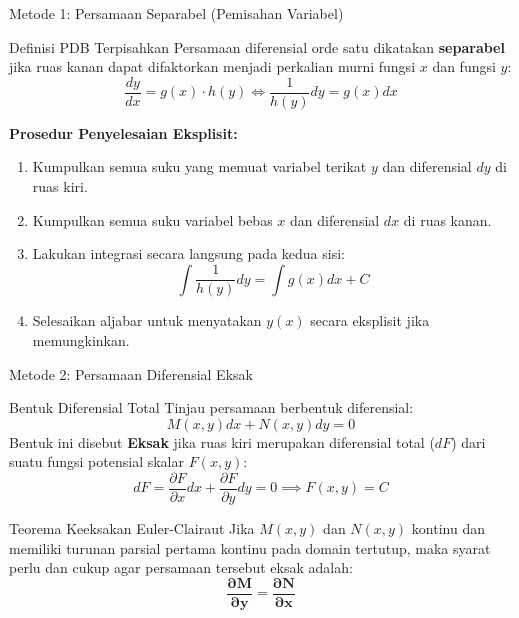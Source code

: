 \documentclass[aspectratio=169,10pt]{beamer}
\begin{document}
\begin{frame}{Metode 1: Persamaan Separabel (Pemisahan Variabel)}
  \begin{block}{Definisi PDB Terpisahkan}
    Persamaan diferensial orde satu dikatakan \textbf{separabel} jika ruas kanan dapat difaktorkan menjadi perkalian murni fungsi $x$ dan fungsi $y$:
    \begin{equation*}
      \frac{dy}{dx} = g(x) \cdot h(y) \iff \frac{1}{h(y)} dy = g(x) dx
    \end{equation*}
  \end{block}
  \vspace{0.15cm}
  \textbf{Prosedur Penyelesaian Eksplisit:}
  \begin{enumerate}
    \item Kumpulkan semua suku yang memuat variabel terikat $y$ dan diferensial $dy$ di ruas kiri.
    \item Kumpulkan semua suku variabel bebas $x$ dan diferensial $dx$ di ruas kanan.
    \item Lakukan integrasi secara langsung pada kedua sisi:
    \begin{equation*}
      \int \frac{1}{h(y)} dy = \int g(x) dx + C
    \end{equation*}
    \item Selesaikan aljabar untuk menyatakan $y(x)$ secara eksplisit jika memungkinkan.
  \end{enumerate}
\end{frame}

\begin{frame}{Metode 2: Persamaan Diferensial Eksak}
  \begin{block}{Bentuk Diferensial Total}
    Tinjau persamaan berbentuk diferensial:
    \begin{equation*}
      M(x,y) dx + N(x,y) dy = 0
    \end{equation*}
    Bentuk ini disebut \textbf{Eksak} jika ruas kiri merupakan diferensial total ($dF$) dari suatu fungsi potensial skalar $F(x,y)$:
    \begin{equation*}
      dF = \frac{\partial F}{\partial x} dx + \frac{\partial F}{\partial y} dy = 0 \implies F(x,y) = C
    \end{equation*}
  \end{block}
  \vspace{0.1cm}
  \begin{alertblock}{Teorema Keeksakan Euler-Clairaut}
    Jika $M(x,y)$ dan $N(x,y)$ kontinu dan memiliki turunan parsial pertama kontinu pada domain tertutup, maka syarat perlu dan cukup agar persamaan tersebut eksak adalah:
    \begin{equation*}
      \mathbf{\frac{\partial M}{\partial y} = \frac{\partial N}{\partial x}}
    \end{equation*}
  \end{alertblock}
\end{frame}
\end{document}
